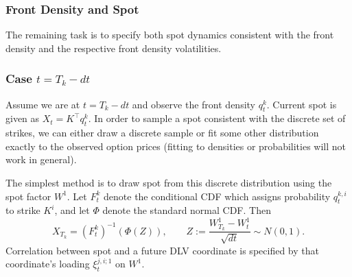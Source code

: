 \documentclass[smallextended,envcountsame,envcountsect]{svjour3}
\begin{document}
  \subsubsection{Front Density and Spot}
  \label{sec:front-density}

  The remaining task is to specify both spot dynamics consistent with the front density and the respective front density volatilities.

  \subsubsection*{Case $t=T_k-dt$}

  Assume we are at $t=T_k-dt$ and observe the front density $q_{t}^k$. Current spot is given as $X_t = K^\top q_t^k$.
  In order to sample a spot consistent with the discrete set of strikes, we can either draw a discrete sample or fit some other distribution exactly to the observed option prices (fitting to densities or probabilities will not work in general).

  The simplest method is to draw spot from this discrete distribution using
  the spot factor $W^1$. Let $F_t^k$ denote the conditional CDF which assigns
  probability $q_t^{k,i}$ to strike $K^i$, and let $\Phi$ denote the standard
  normal CDF. Then
  \[
    X_{T_k}=(F_t^k)^{-1}\!\left(\Phi(Z)\right),
    \qquad
    Z:=\frac{W_{T_k}^1-W_t^1}{\sqrt{dt}}\sim N(0,1).
  \]
  Correlation between spot and a future DLV coordinate is specified by that
  coordinate's loading $\xi_t^{j,i;1}$ on $W^1$.
\end{document}
